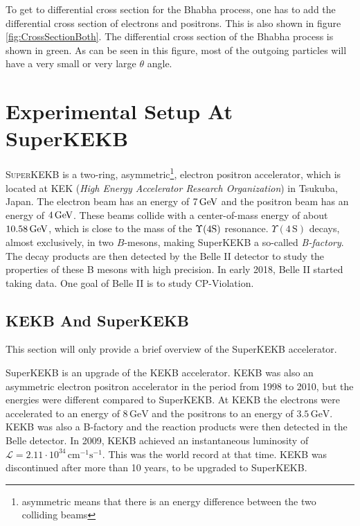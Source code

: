 \documentclass[a4paper,11pt,twosided,final,german,openbib,pdftex,listof=totoc,bibliography=totoc]{scrbook}
\begin{document}
To get to differential cross section for the Bhabha process, one has to add the differential cross section of electrons and positrons. This is also shown in figure \ref{fig:CrossSectionBoth}. The differential cross section of the Bhabha process is shown in green. As can be seen in this figure, most of the outgoing particles will have a very small or very large $\theta$ angle.





\chapter{Experimental Setup At SuperKEKB}
\label{sec:SetupKEK}

\lettrine{S}{uperKEKB} is a two-ring, asymmetric\footnote{asymmetric means that there is an energy difference between the two colliding beams}, electron positron accelerator, which is located at KEK (\textit{High Energy Accelerator Research Organization}) in Tsukuba, Japan. 
The electron beam has an energy of $7\,\textnormal{GeV}$ and the positron beam has an energy of $4\,\textnormal{GeV}$. These beams collide with a center-of-mass energy of about $10.58\,\textnormal{GeV}$, which is close to the mass of the $\Upsilon(4\textnormal{S})$ resonance. $\Upsilon(4\,\textrm{S})$ decays, almost exclusively, in two $B$-mesons, making SuperKEKB a so-called \textit{B-factory}. The decay products are then detected by the Belle II detector to study the properties of these B mesons with high precision. In early 2018, Belle II started taking data. One goal of Belle II is to study CP-Violation.\cite{B2B}

\section{KEKB And SuperKEKB}
\label{sec:KEK}


This section will only provide a brief overview of the SuperKEKB accelerator.

SuperKEKB is an upgrade of the KEKB accelerator. KEKB was also an asymmetric electron positron accelerator in the period from 1998 to 2010, but the energies were different compared to SuperKEKB. At KEKB the electrons were accelerated to an energy of $8\,\textrm{GeV}$ and the positrons to an energy of $3.5\,\textrm{GeV}$. KEKB was also a B-factory and the reaction products were then detected in the Belle detector. In 2009, KEKB achieved an instantaneous luminosity of $\mathcal{L} = 2.11 \cdot 10^{34}\,\textrm{cm}^{-1}\textrm{s}^{-1}$. This was the world record at that time. KEKB was discontinued after more than 10 years, to be upgraded to SuperKEKB.\cite{PTEP}
\end{document}

